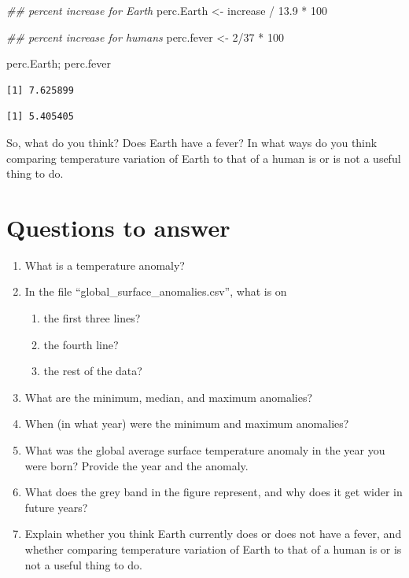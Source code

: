 \documentclass[
  letterpaper,
  DIV=11,
  numbers=noendperiod]{scrreprt}
\newenvironment{Shaded}{\begin{snugshade}}{\end{snugshade}}
\newcommand{\DecValTok}[1]{\textcolor[rgb]{0.68,0.00,0.00}{#1}}
\newcommand{\DocumentationTok}[1]{\textcolor[rgb]{0.37,0.37,0.37}{\textit{#1}}}
\newcommand{\FloatTok}[1]{\textcolor[rgb]{0.68,0.00,0.00}{#1}}
\newcommand{\NormalTok}[1]{\textcolor[rgb]{0.00,0.23,0.31}{#1}}
\newcommand{\OtherTok}[1]{\textcolor[rgb]{0.00,0.23,0.31}{#1}}
\newcommand{\SpecialCharTok}[1]{\textcolor[rgb]{0.37,0.37,0.37}{#1}}
\providecommand{\tightlist}{%
  \setlength{\itemsep}{0pt}\setlength{\parskip}{0pt}}
\begin{document}
\begin{Shaded}
\begin{Highlighting}[]
\DocumentationTok{\#\# percent increase for Earth}
\NormalTok{perc.Earth }\OtherTok{\textless{}{-}}\NormalTok{ increase }\SpecialCharTok{/} \FloatTok{13.9} \SpecialCharTok{*} \DecValTok{100}

\DocumentationTok{\#\# percent increase for humans}
\NormalTok{perc.fever }\OtherTok{\textless{}{-}} \DecValTok{2}\SpecialCharTok{/}\DecValTok{37} \SpecialCharTok{*} \DecValTok{100}

\NormalTok{perc.Earth; perc.fever}
\end{Highlighting}
\end{Shaded}

\begin{verbatim}
[1] 7.625899
\end{verbatim}

\begin{verbatim}
[1] 5.405405
\end{verbatim}

So, what do you think? Does Earth have a fever? In what ways do you
think comparing temperature variation of Earth to that of a human is or
is not a useful thing to do.

\section{Questions to answer}\label{questions-to-answer}

\begin{enumerate}
\def\labelenumi{\arabic{enumi}.}
\tightlist
\item
  What is a temperature anomaly?
\item
  In the file ``global\_surface\_anomalies.csv'', what is on

  \begin{enumerate}
  \def\labelenumii{\alph{enumii}.}
  \tightlist
  \item
    the first three lines?
  \item
    the fourth line?
  \item
    the rest of the data?
  \end{enumerate}
\item
  What are the minimum, median, and maximum anomalies?
\item
  When (in what year) were the minimum and maximum anomalies?
\item
  What was the global average surface temperature anomaly in the year
  you were born? Provide the year and the anomaly.
\item
  What does the grey band in the figure represent, and why does it get
  wider in future years?
\item
  Explain whether you think Earth currently does or does not have a
  fever, and whether comparing temperature variation of Earth to that of
  a human is or is not a useful thing to do.
\end{enumerate}
\end{document}
